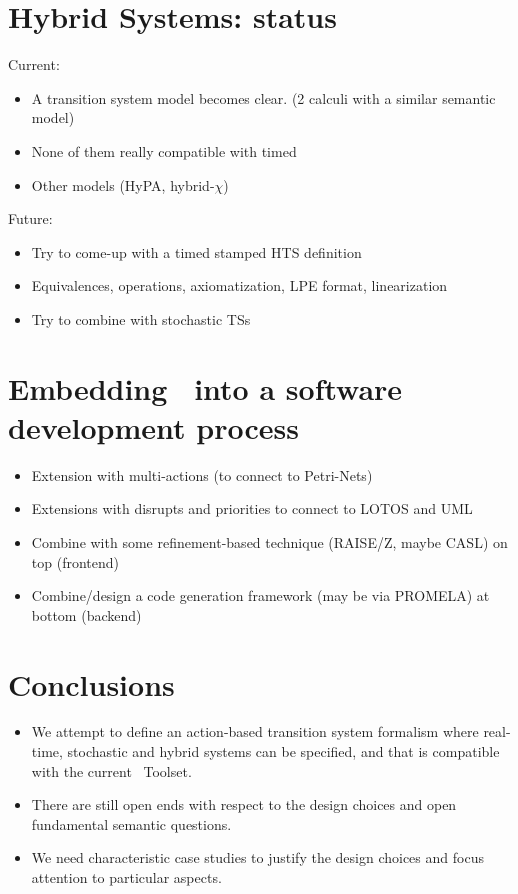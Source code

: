 \begin{slide}
\newslide\section*{Hybrid Systems: status}
Current:
\begin{itemize}
\item A transition system model becomes clear. (2 calculi with a similar semantic model)
\item None of them really compatible with timed \mcrl
\item Other models (HyPA, hybrid-$\chi$)
\end{itemize}
\pause
Future:
\begin{itemize}
\item Try to come-up with a timed stamped HTS definition
\item Equivalences, operations, axiomatization, LPE format, linearization
\item Try to combine with stochastic TSs
\end{itemize}
\newslide\section*{Embedding \mcrl\ into a software development process}
\begin{itemize}
\item Extension with multi-actions (to connect to Petri-Nets)
\item Extensions with disrupts and priorities to connect to LOTOS and UML
\item Combine with some refinement-based technique (RAISE/Z, maybe CASL) on top (frontend)
\item Combine/design a code generation framework (may be via PROMELA) at bottom (backend)
\end{itemize}
\newslide\section*{Conclusions}
\begin{itemize}
\item We attempt to define an action-based transition system formalism 
where real-time, stochastic and hybrid systems can be specified,
and that is compatible with the current \mcrl\ Toolset.
\pause
\item There are still open ends with respect to the design choices 
and open fundamental semantic questions.
\pause
\item We need characteristic case studies to justify the design choices 
and focus attention to particular aspects.
\end{itemize}


\end{slide}

